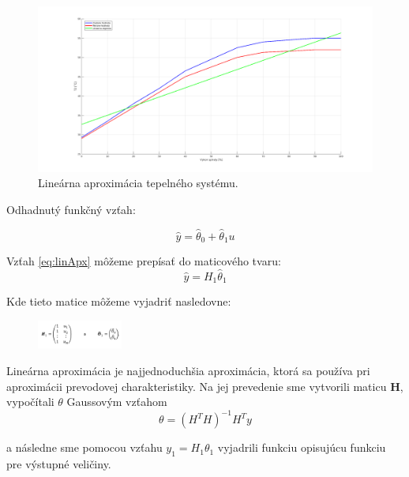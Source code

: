 \documentclass{article}
\begin{document}
\begin{figure}[!htbp]
	\begin{center}
		\includegraphics[width=\textwidth]{include/linearna_regresia.png}
	\end{center}
	\caption{Lineárna aproximácia tepelného systému.}
	\label{fig:linApx}
\end{figure}

Odhadnutý funkčný vzťah:

\begin{equation}
	\hat{y} = \hat{\theta}_0 + \hat{\theta}_1u
	\label{eq:linApx}
\end{equation}

Vzťah \ref{eq:linApx} môžeme prepísať do maticového tvaru:
\begin{equation}
	\hat{y} = H_1\hat{\theta}_1
	\label{eq:linApx2}
\end{equation}

Kde tieto matice môžeme vyjadriť nasledovne:

\begin{figure}[!htbp]
	\begin{center}
		\includegraphics[width=0.25\textwidth]{include/defHandTheta.png}
	\end{center}
\end{figure}

Lineárna aproximácia je najjednoduchšia aproximácia, ktorá sa používa pri aproximácii prevodovej
charakteristiky. Na jej prevedenie sme vytvorili maticu \textbf{H}, vypočítali
\(\theta\) Gaussovým vzťahom
\begin{equation}
	\theta = (H^TH)^{-1}H^Ty
	\label{eq:gausEq}
\end{equation}

a následne sme pomocou vzťahu \(y_1 = H_1\theta_1\) vyjadrili funkciu opisujúcu funkciu pre výstupné
veličiny.
\end{document}
